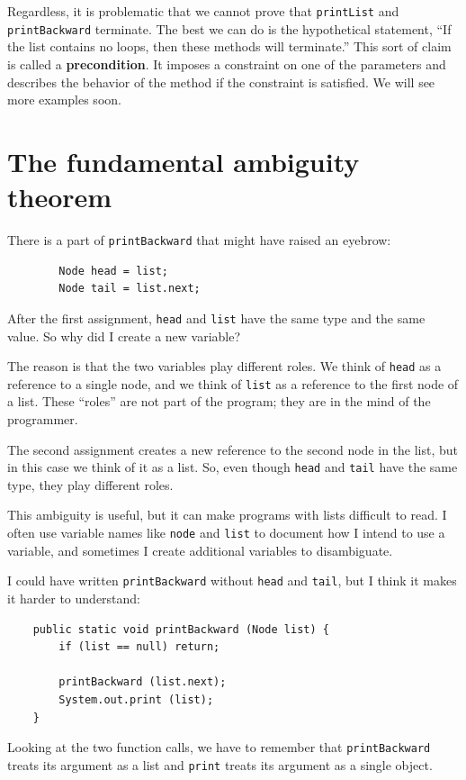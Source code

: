\documentclass[12pt]{book}
\theoremstyle{exercise}
\begin{document}
Regardless, it is problematic that we cannot prove that {\tt printList}
and {\tt printBackward} terminate.  The best we can do is the
hypothetical statement, ``If the list contains no loops, then these
methods will terminate.''  This sort of claim is called a {\bf
precondition}.  It imposes a constraint on one of the parameters and
describes the behavior of the method if the constraint is satisfied.
We will see more examples soon.


\section{The fundamental ambiguity theorem}

There is a part of {\tt printBackward} that might have raised
an eyebrow:

\begin{verbatim}
        Node head = list;
        Node tail = list.next;
\end{verbatim}
%
After the first assignment, {\tt head} and {\tt list} have the same
type and the same value.  So why did I create a new variable?

The reason is that the two variables play different roles.  We think
of {\tt head} as a reference to a single node, and we think of
{\tt list} as a reference to the first node of a list.  These
``roles'' are not part of the program; they are in the mind of the
programmer.


The second assignment creates a new reference to the second node
in the list, but in this case we think of it as a list.
So, even though {\tt head} and {\tt tail} have the same
type, they play different roles.

This ambiguity is useful, but it can make programs with lists
difficult to read.  I often use variable names like {\tt node}
and {\tt list} to document how I intend to use a variable, and
sometimes I create additional variables to disambiguate.

I could have written {\tt printBackward} without {\tt head}
and {\tt tail}, but I think it makes it harder to understand:

\begin{verbatim}
    public static void printBackward (Node list) {
        if (list == null) return;

        printBackward (list.next);
        System.out.print (list);
    }    

\end{verbatim}
%
Looking at the two function calls, we have to remember that
{\tt printBackward} treats its argument as a list and {\tt print}
treats its argument as a single object.
\end{document}
